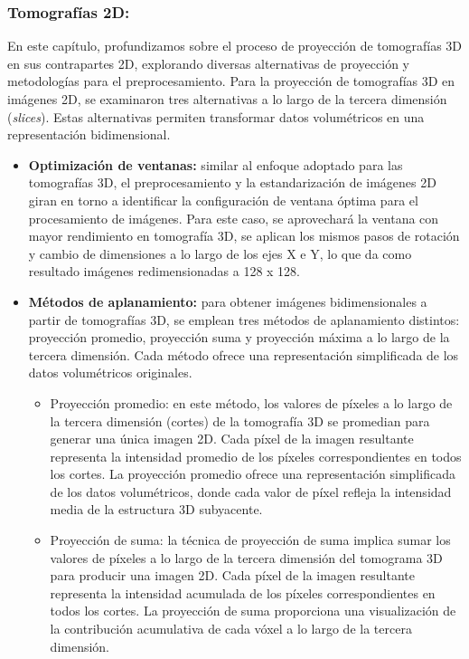 \documentclass[10pt, oneside, a4paper]{article}
\begin{document}
	\subsubsection{Tomografías 2D:}
	En este capítulo, profundizamos sobre el proceso de proyección de tomografías 3D en sus contrapartes 2D, explorando diversas alternativas de proyección y metodologías para el preprocesamiento. Para la proyección de tomografías 3D en imágenes 2D, se examinaron tres alternativas a lo largo de la tercera dimensión (\textsl{slices}). Estas alternativas permiten transformar datos volumétricos en una representación bidimensional.
	
	\begin{itemize}
		\item \textbf{Optimización de ventanas:} similar al enfoque adoptado para las tomografías 3D, el preprocesamiento y la estandarización de imágenes 2D giran en torno a identificar la configuración de ventana óptima para el procesamiento de imágenes. Para este caso, se aprovechará la ventana con mayor rendimiento en tomografía 3D, se aplican los mismos pasos de rotación y cambio de dimensiones a lo largo de los ejes X e Y, lo que da como resultado imágenes redimensionadas a 128 x 128.
		
		\item \textbf{Métodos de aplanamiento:} para obtener imágenes bidimensionales a partir de tomografías 3D, se emplean tres métodos de aplanamiento distintos: proyección promedio, proyección suma y proyección máxima a lo largo de la tercera dimensión. Cada método ofrece una representación simplificada de los datos volumétricos originales.
		
		\begin{itemize}
			\item Proyección promedio: en este método, los valores de píxeles a lo largo de la tercera dimensión (cortes) de la tomografía 3D se promedian para generar una única imagen 2D. Cada píxel de la imagen resultante representa la intensidad promedio de los píxeles correspondientes en todos los cortes. La proyección promedio ofrece una representación simplificada de los datos volumétricos, donde cada valor de píxel refleja la intensidad media de la estructura 3D subyacente.
			
			\item Proyección de suma: la técnica de proyección de suma implica sumar los valores de píxeles a lo largo de la tercera dimensión del tomograma 3D para producir una imagen 2D. Cada píxel de la imagen resultante representa la intensidad acumulada de los píxeles correspondientes en todos los cortes. La proyección de suma proporciona una visualización de la contribución acumulativa de cada vóxel a lo largo de la tercera dimensión.
			

\end{itemize}
\end{itemize}
\end{document}
